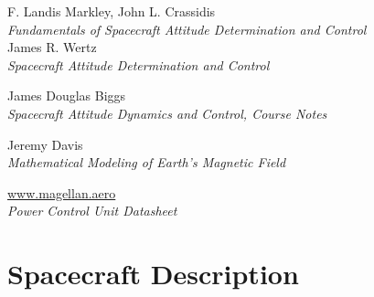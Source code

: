 \documentclass[11pt,a4paper]{report}
\begin{document}



\tableofcontents{}

\clearpage{}

\setcounter{page}{3}

\glsaddall
\glsdisablehyper
\printnoidxglossary[type=\acronymtype,title=Abbreviated Terms]

\nocite{*}
\renewcommand\bibname{Reference Books}
\begin{thebibliography}{0}
    F. Landis Markley, John L. Crassidis \\
    \textit{Fundamentals of Spacecraft Attitude Determination and Control} \\ 
    James R. Wertz \\
    \textit{Spacecraft Attitude Determination and Control}      \\
\end{thebibliography}

\renewcommand\bibname{Reference Notes}
\begin{thebibliography}{0}
\setcounter{enumiv}{2}
    James Douglas Biggs \\
    \textit{Spacecraft Attitude Dynamics and Control, Course Notes}  
\end{thebibliography}

\renewcommand\bibname{Reference Articles}
\begin{thebibliography}{0}
\setcounter{enumiv}{3}
    Jeremy Davis\\
    \textit{Mathematical Modeling of Earth’s Magnetic Field}
\end{thebibliography}

\renewcommand\bibname{Datasheets \& User Manuals}
\renewcommand\UrlFont{\rmfamily}
\begin{thebibliography}{0}
\setcounter{enumiv}{4}
    \url{www.magellan.aero}\\
    \textit{Power Control Unit Datasheet} 
\end{thebibliography}

\chapter{Spacecraft Description}
\end{document}
